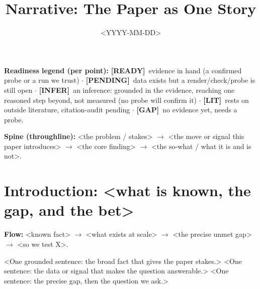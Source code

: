 \documentclass[11pt]{article}
\title{Narrative: The Paper as One Story}
\date{<YYYY-MM-DD>}
\newcommand{\rdy}{\textcolor{cReady}{\textbf{[READY]}}}   %
\newcommand{\pend}{\textcolor{cPend}{\textbf{[PENDING]}}} %
\newcommand{\lit}{\textcolor{cLit}{\textbf{[LIT]}}}       %
\newcommand{\gp}{\textcolor{cGap}{\textbf{[GAP]}}}        %
\newcommand{\infr}{\textcolor{cInfer}{\textbf{[INFER]}}}  %
\newcommand{\rev}[2]{\\{\footnotesize\color{gray}$\hookrightarrow$~\textbf{#1}~#2}}
\begin{document}
\maketitle

\noindent\footnotesize\textbf{Readiness legend (per point):}
\rdy~evidence in hand (a confirmed probe or a run we trust) $\cdot$
\pend~data exists but a render/check/probe is still open $\cdot$
\infr~an inference: grounded in the evidence, reaching one reasoned step beyond, not measured (no probe will confirm it) $\cdot$
\lit~rests on outside literature, citation-audit pending $\cdot$
\gp~no evidence yet, needs a probe.\normalsize

\medskip
\noindent\textbf{Spine (throughline):} <the problem / stakes> $\rightarrow$ <the move or signal this paper introduces> $\rightarrow$ <the core finding> $\rightarrow$ <the so-what / what it is and is not>.


\section*{Introduction: <what is known, the gap, and the bet>}

\noindent\textbf{Flow:} <known fact> $\rightarrow$ <what exists at scale> $\rightarrow$ <the precise unmet gap> $\rightarrow$ <so we test X>.

<One grounded sentence: the broad fact that gives the paper stakes.>
%
<One sentence: the data or signal that makes the question answerable.>
%
<One sentence: the precise gap, then the question we ask.>
\end{document}
